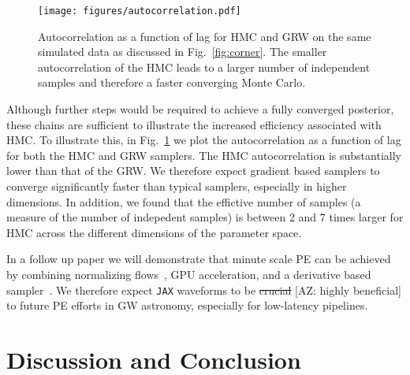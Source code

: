 \documentclass[twocolumn]{aastex631}
\newcommand{\jax}{\texttt{JAX}\xspace}
\newcommand{\AZ}[1]{{\color{Burnt}[AZ: #1]}}
\begin{document}
\begin{figure}[t]
	\begin{centering}
		\texttt{[image: figures/autocorrelation.pdf]}
		\caption{
			Autocorrelation as a function of lag for HMC and GRW on the same simulated data as discussed in Fig.~\ref{fig:corner}.
            The smaller autocorrelation of the HMC leads to a larger number of independent samples and therefore a faster converging Monte Carlo.
		}
		\label{fig:autocorrelation}
	\end{centering}
\end{figure}

Although further steps would be required to achieve a fully converged posterior, these chains are sufficient to illustrate the increased efficiency associated with HMC. 
To illustrate this, in Fig.~\ref{fig:autocorrelation} we plot the autocorrelation as a function of lag for both the HMC and GRW samplers.
The HMC autocorrelation is substantially lower than that of the GRW.
We therefore expect gradient based samplers to converge significantly faster than typical samplers, especially in higher dimensions.
In addition, we found that the effictive number of samples (a measure of the number of indepedent samples) is between 2 and 7 times larger for HMC across the different dimensions of the parameter space.

In a follow up paper we will demonstrate that minute scale PE can be achieved by combining normalizing flows~\citep{2022arXiv221106397W, Gabrie:2021tlu}, GPU acceleration, and a derivative based sampler~\citep{PEpaper}. 
We therefore expect \jax waveforms to be \sout{crucial} \AZ{highly beneficial} to future PE efforts in GW astronomy, especially for low-latency pipelines.



\section{Discussion and Conclusion}
\label{subsec:discussion}
\end{document}
